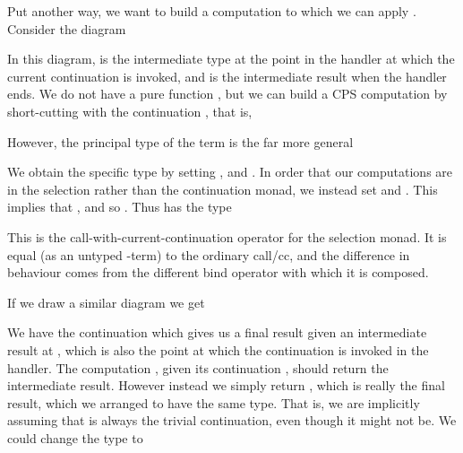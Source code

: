 \documentclass{article}
\begin{document}
Put another way, we want to build a computation  to which we can apply . Consider the diagram
\begin{center}\end{center}
In this diagram,  is the intermediate type at the point in the handler at which the current continuation is invoked, and  is the intermediate result when the handler ends. We do not have a pure function , but we can build a CPS computation  by short-cutting with the continuation , that is,


However, the principal type of the term  is the far more general

We obtain the specific type  by setting ,  and . In order that our computations are in the selection rather than the continuation monad, we instead set  and . This implies that , and so . Thus  has the type

This is the call-with-current-continuation operator for the selection monad. It is equal (as an untyped -term) to the ordinary call/cc, and the difference in behaviour comes from the different bind operator with which it is composed.

If we draw a similar diagram we get
\begin{center}\end{center}
We have the continuation  which gives us a final result given an intermediate result at , which is also the point at which the continuation is invoked in the handler. The computation , given its continuation , should return the intermediate result. However instead we simply return , which is really the final result, which we arranged to have the same type. That is, we are implicitly assuming that  is always the trivial continuation, even though it might not be. We could change the type to
\end{document}
